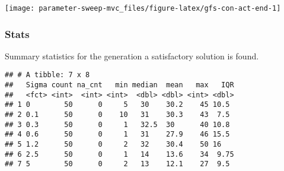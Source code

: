 \documentclass[]{book}
\newenvironment{Shaded}{\begin{snugshade}}{\end{snugshade}}
\newcommand{\DataTypeTok}[1]{\textcolor[rgb]{0.13,0.29,0.53}{#1}}
\newcommand{\DecValTok}[1]{\textcolor[rgb]{0.00,0.00,0.81}{#1}}
\newcommand{\KeywordTok}[1]{\textcolor[rgb]{0.13,0.29,0.53}{\textbf{#1}}}
\newcommand{\NormalTok}[1]{#1}
\newcommand{\OperatorTok}[1]{\textcolor[rgb]{0.81,0.36,0.00}{\textbf{#1}}}
\newcommand{\OtherTok}[1]{\textcolor[rgb]{0.56,0.35,0.01}{#1}}
\newcommand{\StringTok}[1]{\textcolor[rgb]{0.31,0.60,0.02}{#1}}
\begin{document}
\texttt{[image: parameter-sweep-mvc\_files/figure-latex/gfs-con-act-end-1]}

\hypertarget{stats-24}{%
\subsubsection{Stats}\label{stats-24}}

Summary statistics for the generation a satisfactory solution is found.

\begin{Shaded}
\end{Shaded}

\begin{verbatim}
## # A tibble: 7 x 8
##   Sigma count na_cnt   min median  mean   max   IQR
##   <fct> <int>  <int> <int>  <dbl> <dbl> <int> <dbl>
## 1 0        50      0     5   30    30.2    45 10.5 
## 2 0.1      50      0    10   31    30.3    43  7.5 
## 3 0.3      50      0     1   32.5  30      40 10.8 
## 4 0.6      50      0     1   31    27.9    46 15.5 
## 5 1.2      50      0     2   32    30.4    50 16   
## 6 2.5      50      0     1   14    13.6    34  9.75
## 7 5        50      0     2   13    12.1    27  9.5
\end{verbatim}
\end{document}

